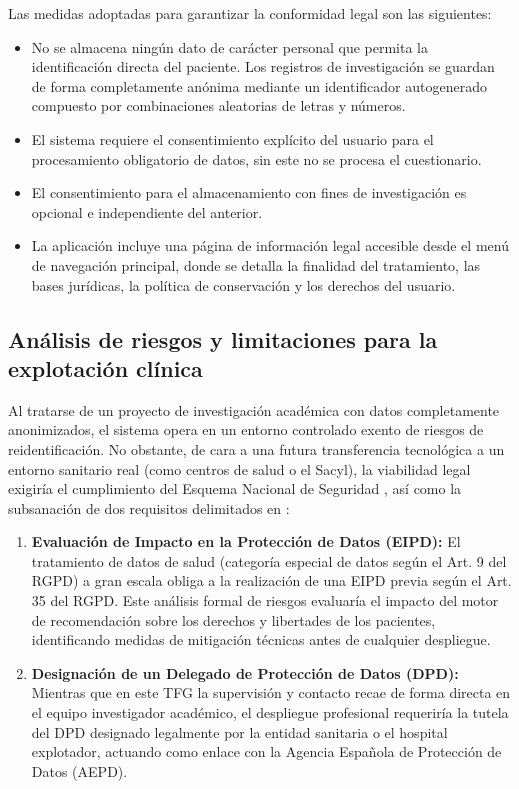 Las medidas adoptadas para garantizar la conformidad legal son las siguientes:

\begin{itemize}
	\item No se almacena ningún dato de carácter personal que permita la identificación directa del paciente. Los registros de investigación se guardan de forma completamente anónima mediante un identificador autogenerado compuesto por combinaciones aleatorias de letras y números.
	\item El sistema requiere el consentimiento explícito del usuario para el procesamiento obligatorio de datos, sin este no se procesa el cuestionario.
	\item El consentimiento para el almacenamiento con fines de investigación es opcional e independiente del anterior.
	\item La aplicación incluye una página de información legal accesible desde el menú de navegación principal, donde se detalla la finalidad del tratamiento, las bases jurídicas, la política de conservación y los derechos del usuario.
\end{itemize}

\subsection{Análisis de riesgos y limitaciones para la explotación clínica}
Al tratarse de un proyecto de investigación académica con datos completamente anonimizados, el sistema opera en un entorno controlado exento de riesgos de reidentificación. No obstante, de cara a una futura transferencia tecnológica a un entorno sanitario real (como centros de salud o el Sacyl), la viabilidad legal exigiría el cumplimiento del Esquema Nacional de Seguridad \cite{boe:ens}, así como la subsanación de dos requisitos delimitados en \cite{ue:rgpd}:

\begin{enumerate}
    	\item \textbf{Evaluación de Impacto en la Protección de Datos (EIPD):} El tratamiento de datos de salud (categoría especial de datos según el Art. 9 del RGPD) a gran escala obliga a la realización de una EIPD previa según el Art. 35 del RGPD. Este análisis formal de riesgos evaluaría 		el impacto del motor de recomendación sobre los derechos y libertades de los pacientes, identificando medidas de mitigación técnicas antes de cualquier despliegue.
   	 \item \textbf{Designación de un Delegado de Protección de Datos (DPD):} Mientras que en este TFG la supervisión y contacto recae de forma directa en el equipo investigador académico, el despliegue profesional requeriría la tutela del DPD designado legalmente por la entidad 			sanitaria o el hospital explotador, actuando como enlace con la Agencia Española de Protección de Datos (AEPD).
\end{enumerate}